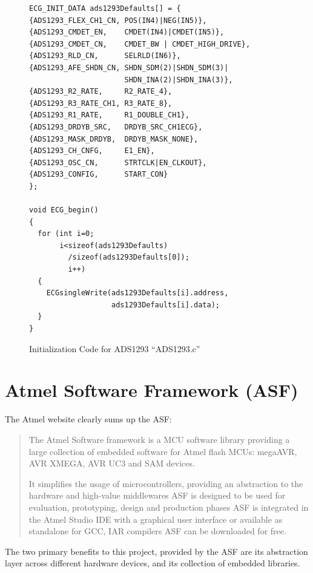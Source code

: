 \begin{figure}
	\begin{center}
\begin{lstlisting}[frame=single,morekeywords={ECG_INIT_DATA}]
ECG_INIT_DATA ads1293Defaults[] = {
{ADS1293_FLEX_CH1_CN, POS(IN4)|NEG(IN5)}, 
{ADS1293_CMDET_EN,    CMDET(IN4)|CMDET(IN5)},
{ADS1293_CMDET_CN,    CMDET_BW | CMDET_HIGH_DRIVE},
{ADS1293_RLD_CN,      SELRLD(IN6)},
{ADS1293_AFE_SHDN_CN, SHDN_SDM(2)|SHDN_SDM(3)|
                      SHDN_INA(2)|SHDN_INA(3)},
{ADS1293_R2_RATE,     R2_RATE_4},
{ADS1293_R3_RATE_CH1, R3_RATE_8},
{ADS1293_R1_RATE,     R1_DOUBLE_CH1},
{ADS1293_DRDYB_SRC,   DRDYB_SRC_CH1ECG},
{ADS1293_MASK_DRDYB,  DRDYB_MASK_NONE},
{ADS1293_CH_CNFG,     E1_EN},
{ADS1293_OSC_CN,      STRTCLK|EN_CLKOUT},
{ADS1293_CONFIG,      START_CON}
};

void ECG_begin()
{
  for (int i=0;
       i<sizeof(ads1293Defaults)
         /sizeof(ads1293Defaults[0]);
         i++)
  {
    ECGsingleWrite(ads1293Defaults[i].address,
                   ads1293Defaults[i].data);
  }
}
\end{lstlisting}
		\caption{Initialization Code for ADS1293 ``ADS1293.c''}
		\label{fig:ADS1293_INIT}
	\end{center}
\end{figure}



\section{Atmel Software Framework (ASF)}
The Atmel website clearly sums up the ASF:

\begin{quotation}
The Atmel Software framework is a MCU software library providing a large collection of embedded software for Atmel flash MCUs: megaAVR, AVR XMEGA, AVR UC3 and SAM devices.

It  simplifies the usage of microcontrollers, providing an abstraction to the hardware and high-value middlewares
ASF is designed to be used for evaluation, prototyping, design and production phases
ASF is integrated in the Atmel Studio IDE with a graphical user interface or available as standalone for GCC, IAR compilers
ASF can be downloaded for free. \cite{AtmelStudio}
\end{quotation} 

The two primary benefits to this project, provided by the ASF are its abstraction layer across different hardware devices, and its collection of embedded libraries.

